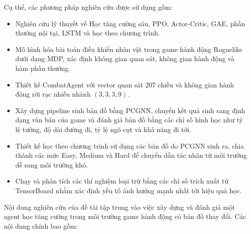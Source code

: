 Cụ thể, các phương pháp nghiên cứu được sử dụng gồm:
\renewcommand{\labelitemi}{$-$}
\begin{itemize}
    \item Nghiên cứu lý thuyết về Học tăng cường sâu, PPO, Actor-Critic, GAE, phần thưởng nội tại, LSTM và học theo chương trình.
    \item Mô hình hóa bài toán điều khiển nhân vật trong game hành động Roguelike dưới dạng MDP, xác định không gian quan sát, không gian hành động và hàm phần thưởng.
    \item Thiết kế CombatAgent với vector quan sát 207 chiều và không gian hành động rời rạc nhiều nhánh $(3,3,3,9)$.
    \item Xây dựng pipeline sinh bản đồ bằng PCGNN, chuyển kết quả sinh sang định dạng văn bản của game và đánh giá bản đồ bằng các chỉ số hình học như tỷ lệ tường, độ dài đường đi, tỷ lệ ngõ cụt và khả năng đi tới.
    \item Thiết kế học theo chương trình sử dụng các bản đồ do PCGNN sinh ra, chia thành các mức Easy, Medium và Hard để chuyển dần tác nhân từ môi trường dễ sang môi trường khó.
    \item Chạy và phân tích các thí nghiệm loại trừ bằng các chỉ số trích xuất từ TensorBoard nhằm xác định yếu tố ảnh hưởng mạnh nhất tới hiệu quả học.
\end{itemize}

\vspace{0.3cm}


Nội dung nghiên cứu của đề tài tập trung vào việc xây dựng và đánh giá một agent học tăng cường trong môi trường game hành động có bản đồ thay đổi. Các nội dung chính bao gồm:

